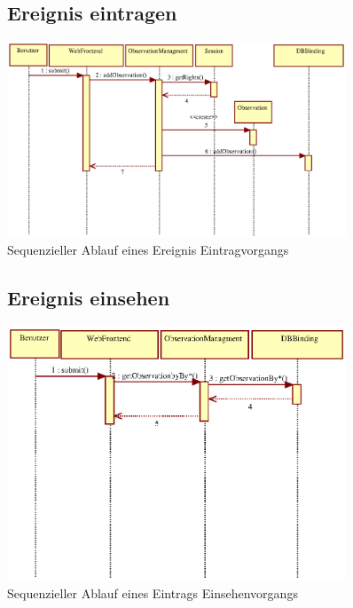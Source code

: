 \documentclass[a4paper,11pt]{scrartcl}
\begin{document}
\begin{figure}[h]
\subsection{Ereignis eintragen}
		\centering
		\includegraphics[width=0.90\textwidth]{images/seq09_EreignisEintragen.eps}
		\caption{Sequenzieller Ablauf eines Ereignis Eintragvorgangs}
		\label{seq02}
\end{figure}


\begin{figure}[h]
\subsection{Ereignis einsehen}
		\centering
		\includegraphics[width=0.90\textwidth]{images/seq10_EreignisEinsehen.eps}
		\caption{Sequenzieller Ablauf eines Eintrags Einsehenvorgangs}
		\label{seq10}
\end{figure}
\end{document}
